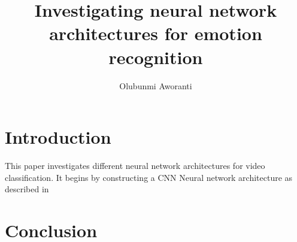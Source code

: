 \documentclass{article}
\title{Investigating neural network architectures for emotion recognition}
\author{Olubunmi Aworanti}
\date{}
\begin{document}
\begin{abstract}
\end{abstract}

\maketitle

\section{Introduction}
This paper investigates different neural network architectures for video classification. It begins by constructing a CNN Neural network architecture as described in \citep{KarpathyCVPR14}


\section{Conclusion}

\citep{adams1995hitchhiker}



\end{document}
